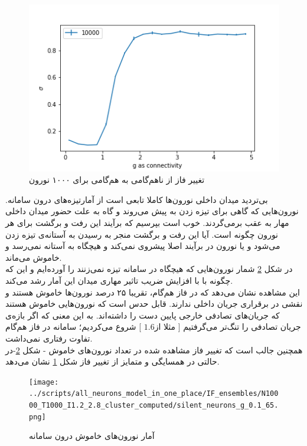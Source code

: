 \documentclass[12pt,onecolumn,a4paper]{article}
\begin{document}
\begin{figure}[h]
\centering
  \includegraphics[width = 10 cm]{../papers_studies/figs/IF/sigma.png}
 \caption{تغییر فاز از ناهم‌گامی به هم‌گامی برای ۱۰۰۰ نورون}
  \label{fig:if_phase_transition}
\end{figure}

بی‌تردید میدان داخلی نورون‌ها کاملا تابعی است از آمارتیزه‌های درون سامانه. نورون‌هایی که گاهی برای تیزه زدن به پیش می‌روند و گاه به علت حضور میدان داخلی مهار به عقب برمی‌گردند. خوب است بپرسیم که برآیند این رفت و برگشت‌ برای هر نورون چگونه است. آیا این رفت و برگشت منجر به رسیدن به آستانه‌ی تیزه زدن می‌شود و یا نورون در برآیند اصلا پیشروی نمی‌کند و هیچگاه به آستانه نمی‌رسد و خاموش می‌ماند.\\
در شکل \ref{fig:if_silent_neurons} شمار نورون‌هایی که هیچگاه در سامانه تیزه نمی‌زنند را آورده‌ایم و این که چگونه با با افزایش ضریب تاثیر مهاری میدان این آمار رشد می‌کند.\\
این مشاهده نشان می‌دهد که در فاز هم‌گام، تقریبا ۲۵ درصد نورون‌ها خاموش هستند و نقشی در برقراری جریان داخلی ندارند. قابل حدس است که نورون‌هایی خاموش هستند که جریان‌های تصادفی خارجی پایین دست را داشته‌اند. به این معنی که اگر بازه‌ی جریان تصادفی را تنگ‌تر می‌گرفتیم [ مثلا از$1.6$ ] شروع می‌کردیم؛ سامانه در فاز هم‌گام تفاوت رفتاری نمی‌داشت.\\
همچنین جالب است که تغییر فاز مشاهده شده در تعداد نورون‌های خاموش - شکل \ref{fig:if_silent_neurons}-در حالتی در همسایگی و متمایز از تغییر فاز شکل \ref{fig:if_phase_transition} نشان می‌دهد.
\begin{figure}[h]
\centering
  \texttt{[image: ../scripts/all\_neurons\_model\_in\_one\_place/IF\_ensembles/N10000\_T1000\_I1.2\_2.8\_cluster\_computed/silent\_neurons\_g\_0.1\_65.png]}
 \caption{آمار نورون‌های خاموش درون سامانه}
  \label{fig:if_silent_neurons}
\end{figure}
\end{document}
